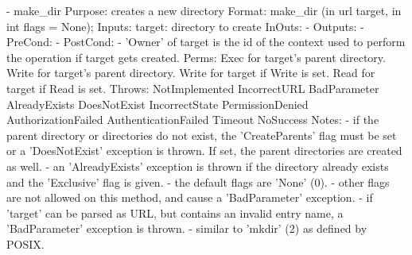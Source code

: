 \begin{myspec}
 
    - make_dir
      Purpose:  creates a new directory
      Format:   make_dir           (in  url        target,
                                    in  int     flags = None);
      Inputs:   target:             directory to create
      InOuts:   -
      Outputs:  -
      PreCond:  -
      PostCond: - 'Owner' of target is the id of the context
                  used to perform the operation if target gets
                  created.
      Perms:    Exec  for target's parent directory.
                Write for target's parent directory.
                Write for target if Write is set.
                Read  for target if Read  is set.
      Throws:   NotImplemented
                IncorrectURL
                BadParameter
                AlreadyExists
                DoesNotExist
                IncorrectState
                PermissionDenied
                AuthorizationFailed
                AuthenticationFailed
                Timeout
                NoSuccess
      Notes:    - if the parent directory or directories do not
                  exist, the 'CreateParents' flag must be set 
                  or a 'DoesNotExist' exception is thrown.  
                  If set, the parent directories are created as 
                  well.
                - an 'AlreadyExists' exception is thrown if the
                  directory already exists and the 'Exclusive' 
                  flag is given.
                - the default flags are 'None' (0).
                - other flags are not allowed on this method, 
                  and cause a 'BadParameter' exception.
                - if 'target' can be parsed as URL, but contains 
                  an invalid entry name, a 'BadParameter'
                  exception is thrown.
                - similar to 'mkdir' (2) as defined by POSIX.
 

\end{myspec}
